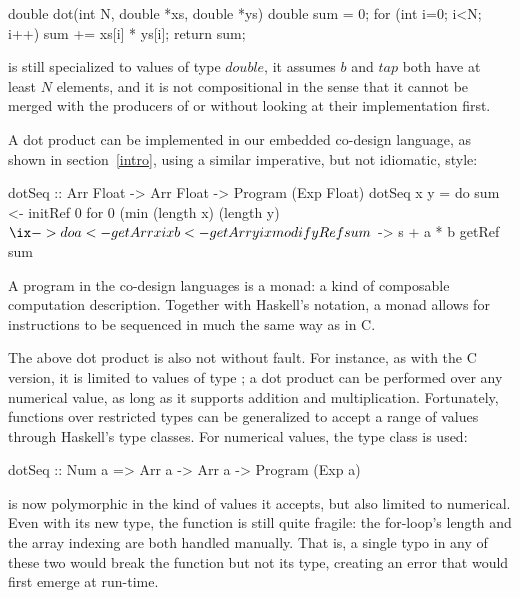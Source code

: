 \documentclass[../paper.tex]{subfiles}
\begin{document}

\begin{code}
double dot(int N, double *xs, double *ys) {
  double sum = 0;
  for (int i=0; i<N; i++) sum += xs[i] * ys[i];
  return sum;
}
\end{code}

\noindent {} is still specialized to values of type $double$, it assumes $b$ and $tap$ both have at least $N$ elements, and it is not compositional in the sense that it cannot be merged with the producers of  or  without looking at their implementation first.

A dot product can be implemented in our embedded co-design language, as shown in section~\ref{intro}, using a similar imperative, but not idiomatic, style:

\begin{code}
dotSeq :: Arr Float -> Arr Float -> Program (Exp Float)
dotSeq x y = do
  sum <- initRef 0
  for 0 (min (length x) (length y) $ \ix -> do
    a <- getArr x ix
    b <- getArr y ix
    modifyRef sum $ \s -> s + a * b
  getRef sum
\end{code}

\noindent A program in the co-design languages is a monad: a kind of composable computation description. Together with Haskell's  notation, a monad allows for instructions to be sequenced in much the same way as in C.

The above dot product is also not without fault. For instance, as with the C version, it is limited to values of type ; a dot product can be performed over any numerical value, as long as it supports addition and multiplication. Fortunately, functions over restricted types can be generalized to accept a range of values through Haskell's type classes. For numerical values, the type class  is used:


\begin{code}
dotSeq :: Num a => Arr a -> Arr a -> Program (Exp a)
\end{code}

\noindent {} is now polymorphic in the kind of values it accepts, but also limited to numerical. Even with its new type, the function is still quite fragile: the for-loop's length and the array indexing are both handled manually. That is, a single typo in any of these two would break the function but not its type, creating an error that would first emerge at run-time.
\end{document}
